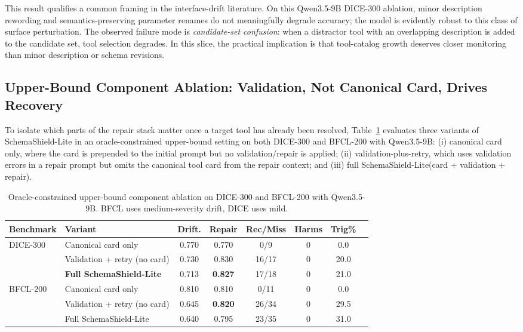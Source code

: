 \documentclass[runningheads]{llncs}
\newcommand{\method}{SchemaShield-Lite\xspace}
\begin{document}
This result qualifies a common framing in the interface-drift literature. On this
Qwen3.5-9B DICE-300 ablation, minor description rewording and
semantics-preserving parameter renames do not meaningfully degrade accuracy; the
model is evidently robust to this class of surface perturbation. The observed
failure mode is \emph{candidate-set confusion}: when a distractor tool with an
overlapping description is added to the candidate set, tool selection degrades.
In this slice, the practical implication is that tool-catalog growth deserves
closer monitoring than minor description or schema revisions.

\subsection{Upper-Bound Component Ablation: Validation, Not Canonical Card, Drives Recovery}
\label{sec:component-ablation}
To isolate which parts of the repair stack matter once a target tool has already
been resolved, Table~\ref{tab:component-ablation} evaluates three variants of
\method in an oracle-constrained upper-bound setting on both DICE-300 and BFCL-200
with Qwen3.5-9B: (i) canonical card only, where the card is prepended to the
initial prompt but no validation/repair is applied; (ii) validation-plus-retry,
which uses validation errors in a repair prompt but omits the canonical tool card
from the repair context; and (iii) full \method (card + validation + repair).

\begin{table}[t]
\caption{Oracle-constrained upper-bound component ablation on DICE-300 and
BFCL-200 with Qwen3.5-9B. BFCL uses medium-severity drift, DICE uses mild.}
\label{tab:component-ablation}
\centering
\small
\begin{tabular}{llcccccc}
\toprule
Benchmark & Variant & Drift. & Repair & Rec/Miss & Harms & Trig\% \\
\midrule
\multirow{3}{*}{DICE-300}
& Canonical card only            & 0.770 & 0.770 & 0/9   & 0 & 0.0 \\
& Validation + retry (no card)   & 0.730 & 0.830 & 16/17 & 0 & 20.0 \\
& \textbf{Full \method}          & 0.713 & \textbf{0.827} & 17/18 & 0 & 21.0 \\
\midrule
\multirow{3}{*}{BFCL-200}
& Canonical card only            & 0.810 & 0.810 & 0/11  & 0 & 0.0 \\
& Validation + retry (no card)   & 0.645 & \textbf{0.820} & 26/34 & 0 & 29.5 \\
& Full \method                   & 0.640 & 0.795 & 23/35 & 0 & 31.0 \\
\bottomrule
\end{tabular}
\end{table}
\end{document}
